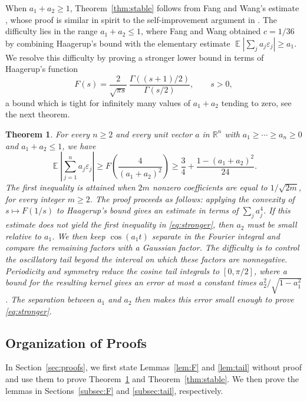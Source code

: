 \documentclass[a4paper,twoside,11pt,reqno]{amsart}
\newtheorem{theorem}{Theorem}
\theoremstyle{definition}
\theoremstyle{remark}
\newcommand{\1}{\mathbbm{1}}
\newcommand{\R}{\mathbb{R}}
\DeclareMathOperator{\E}{\mathbb{E}}
\def \R {\mathbb{R}}
\begin{document}
When $a_1+a_2\ge1$, Theorem~\ref{thm:stable} follows from Fang and Wang's estimate \cite[Theorem~1]{FW26}, whose proof is similar in spirit to the self-improvement argument in \cite[Section~5.1, Lemma~21]{ENT24}. The difficulty lies in the range $a_1+a_2\le1$, where Fang and Wang obtained $c=1/36$ by combining Haagerup's bound with the elementary estimate $\E|\sum_j a_j\varepsilon_j|\ge a_1$. We resolve this difficulty by proving a stronger lower bound in terms of Haagerup's function
\begin{equation}\label{eq:F}
 F(s)=\frac{2}{\sqrt{\pi s}}\,
       \frac{\Gamma((s+1)/2)}{\Gamma(s/2)},\qquad s>0,
\end{equation}
a bound which is tight for infinitely many values of $a_1+a_2$ tending to zero, see the next theorem.

\begin{theorem}\label{thm:stronger}
For every $n\ge2$ and every unit vector $a$ in $\R^n$ with $a_1\ge\cdots\ge a_n\ge0$ and $a_1+a_2\le1$, we have
\begin{equation}\label{eq:stronger}
 \E\left|\sum_{j=1}^n a_j\varepsilon_j\right|
 \ge F\!\left(\frac4{(a_1+a_2)^2}\right)
 \ge\frac34+\frac{1-(a_1+a_2)^2}{24}.
\end{equation}
The first inequality is attained when $2m$ nonzero coefficients are equal to $1/\sqrt{2m}$, for every integer $m\ge2$. \normalfont The proof proceeds as follows: applying the convexity of $s\mapsto F(1/s)$ to Haagerup's bound gives an estimate in terms of $\sum_j a_j^4$. If this estimate does not yield the first inequality in \eqref{eq:stronger}, then $a_2$ must be small relative to $a_1$. We then keep $\cos(a_1t)$ separate in the Fourier integral and compare the remaining factors with a Gaussian factor. The difficulty is to control the oscillatory tail beyond the interval on which these factors are nonnegative. Periodicity and symmetry reduce the cosine tail integrals to $[0,\pi/2]$, where a bound for the resulting kernel gives an error at most a constant times $a_2^2/\sqrt{1-a_1^2}$. The separation between $a_1$ and $a_2$ then makes this error small enough to prove \eqref{eq:stronger}.
\end{theorem}

\subsection{Organization of Proofs}
In Section~\ref{sec:proofs}, we first state Lemmas~\ref{lem:F} and \ref{lem:tail} without proof and use them to prove Theorem~\ref{thm:stronger} and Theorem~\ref{thm:stable}. We then prove the lemmas in Sections~\ref{subsec:F} and \ref{subsec:tail}, respectively.
\end{document}
